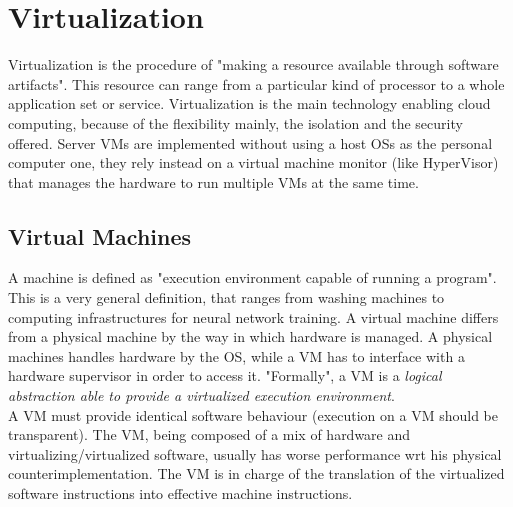 \documentclass[10pt,a4paper]{article}
\begin{document}
		\section{Virtualization}
			Virtualization is the procedure of "making a resource available through software artifacts". This resource can range from a particular kind of processor to a whole application set or service. Virtualization is the main technology enabling cloud computing, because of the flexibility mainly, the isolation and the security offered. Server VMs are implemented without using a host OSs as the personal computer one, they rely instead on a virtual machine monitor (like HyperVisor) that manages the hardware to run multiple VMs at the same time.
			
			\subsection{Virtual Machines}
				A machine is defined as "execution environment capable of running a program". This is a very general definition, that ranges from washing machines to computing infrastructures for neural network training. A virtual machine differs from a physical machine by the way in which hardware is managed. A physical machines handles hardware by the OS, while a VM has to interface with a hardware supervisor in order to access it. "Formally", a VM is a \emph{logical abstraction able to provide a virtualized execution environment}.\\
				A VM must provide identical software behaviour (execution on a VM should be transparent). The VM, being composed of a mix of hardware and virtualizing/virtualized software, usually has worse performance wrt his physical counterimplementation. The VM is in charge of the translation of the virtualized software instructions into effective machine instructions. 
	
\end{document}
